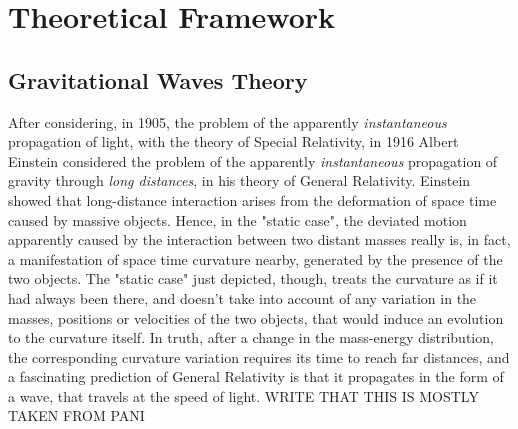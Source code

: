 \chapter{Theoretical Framework}


\section{Gravitational Waves Theory}
After considering, in 1905, the problem of the apparently \textit{instantaneous} propagation of light, with the theory of Special Relativity, in 1916 Albert Einstein considered the problem of the apparently \textit{instantaneous} propagation of gravity through \textit{long distances}, in his theory of General Relativity.
Einstein showed that long-distance interaction arises from the deformation of space time caused by massive objects.
Hence, in the "static case", the deviated motion apparently caused by the interaction between two distant masses really is, in fact, a manifestation of space time curvature nearby, generated by the presence of the two objects.
The "static case" just depicted, though, treats the curvature as if it had always been there, and doesn't take into account of any variation in the masses, positions or velocities of the two objects, that would induce an evolution to the curvature itself.
In truth, after a change in the mass-energy distribution, the corresponding curvature variation requires its time to reach far distances, and a fascinating prediction of General Relativity is that it propagates in the form of a wave, that travels at the speed of light.
WRITE THAT THIS IS MOSTLY TAKEN FROM PANI
